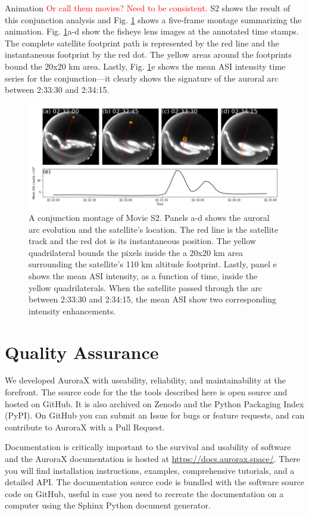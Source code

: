 \documentclass[draft]{agujournal2019}
\begin{document}
Animation \textcolor{red}{Or call them movies? Need to be consistent.} S2 shows the result of this conjunction analysis and Fig. \ref{fig4} shows a five-frame montage summarizing the animation. Fig. \ref{fig4}a-d show the fisheye lens images at the annotated time stamps. The complete satellite footprint path is represented by the red line and the instantaneous footprint by the red dot. The yellow areas around the footprints bound the 20x20 km area. Lastly, Fig. \ref{fig4}e shows the mean ASI intensity time series for the conjunction---it clearly shows the signature of the auroral arc between 2:33:30 and 2:34:15.

\begin{figure}
      \includegraphics[width=\textwidth]{figures/fig4.png}
      \caption{A conjunction montage of Movie S2. Panels a-d shows the auroral arc evolution and the satellite's location. The red line is the satellite track and the red dot is its instantaneous position. The yellow quadrilateral bounds the pixels inside the a 20x20 km area surrounding the satellite's 110 km altitude footprint. Lastly, panel e shows the mean ASI intensity, as a function of time, inside the yellow quadrilaterals. When the satellite passed through the arc between 2:33:30 and 2:34:15, the mean ASI show two corresponding intensity enhancements.}
      \label{fig4}
\end{figure}

\section{Quality Assurance}
We developed AuroraX with useability, reliability, and maintainability at the forefront. The source code for the the tools described here is open source and hosted on GitHub. It is also archived on Zenodo and the Python Packaging Index (PyPI). On GitHub you can submit an Issue for bugs or feature requests, and can contribute to AuroraX with a Pull Request.  

Documentation is critically important to the survival and usability of software and the AuroraX documentation is hosted at \url{https://docs.aurorax.space/}. There you will find installation instructions, examples, comprehensive tutorials, and a detailed API. The documentation source code is bundled with the software source code on GitHub, useful in case you need to recreate the documentation on a computer using the Sphinx Python document generator.
\end{document}
